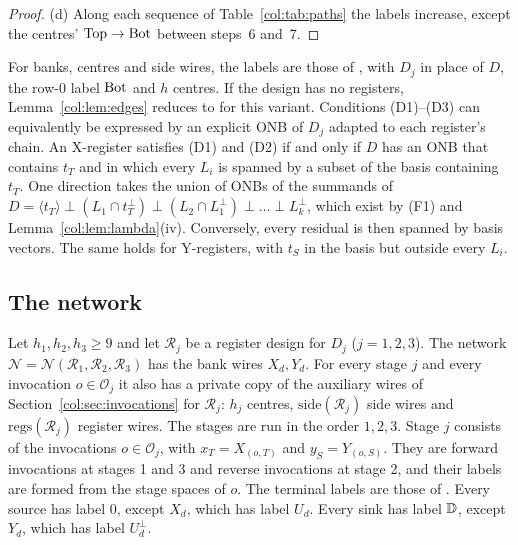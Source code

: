 \begin{proof}
(d) Along each sequence of Table~\ref{col:tab:paths} the labels increase, except the centres'
$\mathrm{Top}\to\mathrm{Bot}$ between steps~6 and~7.
\end{proof}

\begin{remark}\label{col:rem:edges}
For banks, centres and side wires, the labels are those of \cite[(2.7)]{oai}, with $D_j$ in place of $D$,
the row-0 label $\mathrm{Bot}$ and $h$ centres. If the design has no registers, Lemma~\ref{col:lem:edges}
reduces to \cite[Lemma~2.3]{oai} for this variant. Conditions (D1)--(D3) can equivalently be
expressed by an explicit ONB of $D_j$ adapted to each register's chain. An X-register satisfies (D1) and (D2) if and only if $D$ has an ONB that contains $t_T$ and in which every
$L_i$ is spanned by a subset of the basis containing $t_T$. One direction takes the union of ONBs of
the summands of $D=\langle t_T\rangle\perp(L_1\cap t_T^\perp)\perp(L_2\cap L_1^\perp)\perp\dots\perp L_k^\perp$,
which exist by (F1) and Lemma~\ref{col:lem:lambda}(iv). Conversely, every residual is then spanned by
basis vectors. The same holds for Y-registers, with $t_S$ in the basis but outside every $L_i$.
\end{remark}

\subsection{The network}\label{col:sec:network}

\begin{definition}\label{col:def:network}
Let $h_1,h_2,h_3\ge9$ and let $\mathcal R_j$ be a register design for $D_j$ ($j=1,2,3$). The network
$\mathcal N=\mathcal N(\mathcal R_1,\mathcal R_2,\mathcal R_3)$ has the bank wires $X_d,Y_d$. For every
stage $j$ and every invocation $o\in\mathcal O_j$ it also has a private copy of the auxiliary wires of
Section~\ref{col:sec:invocations} for $\mathcal R_j$: $h_j$ centres, $\mathrm{side}(\mathcal R_j)$ side wires and
$\mathrm{regs}(\mathcal R_j)$ register wires. The stages are run in the order $1,2,3$. Stage $j$ consists of
the invocations $o\in\mathcal O_j$, with $x_T=X_{(o,T)}$ and $y_S=Y_{(o,S)}$. They are forward
invocations at stages 1 and 3 and reverse invocations at stage 2, and their labels are formed from the
stage spaces of $o$. The terminal labels are those of \cite[\S2.3]{oai}. Every source has label $0$,
except $X_d$, which has label $U_d$. Every sink has label $\mathbb{D}$, except $Y_d$, which has label
$U_d^\perp$.
\end{definition}

